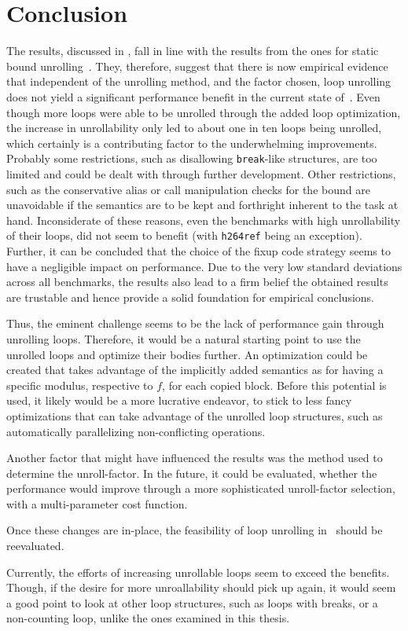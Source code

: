 \chapter{Conclusion}\label{sec:conclusion}

The results, discussed in , fall in line with the results from the ones for static bound unrolling~\cite{aebi18bachelorarbeit}.
They, therefore, suggest that there is now empirical evidence that independent of the unrolling method, and the factor chosen, loop unrolling does not yield a significant performance benefit in the current state of~\libFIRM.
Even though more loops were able to be unrolled through the added loop optimization, the increase in unrollability only led to about one in ten loops being unrolled, which certainly is a contributing factor to the underwhelming improvements.
Probably some restrictions, such as disallowing \texttt{break}-like structures, are too limited and could be dealt with through further development.
Other restrictions, such as the conservative alias or call manipulation checks for the bound are unavoidable if the semantics are to be kept and forthright inherent to the task at hand.
Inconsiderate of these reasons, even the benchmarks with high unrollability of their loops, did not seem to benefit (with \texttt{h264ref} being an exception).
Further, it can be concluded that the choice of the fixup code strategy seems to have a negligible impact on performance.
Due to the very low standard deviations across all benchmarks, the results also lead to a firm belief the obtained results are trustable and hence provide a solid foundation for empirical conclusions.

Thus, the eminent challenge seems to be the lack of performance gain through unrolling loops.
Therefore, it would be a natural starting point to use the unrolled loops and optimize their bodies further.
An optimization could be created that takes advantage of the implicitly added semantics as for having a specific modulus, respective to $f$, for each copied block.
Before this potential is used, it likely would be a more lucrative endeavor, to stick to less fancy optimizations that can take advantage of the unrolled loop structures, such as automatically parallelizing non-conflicting operations.

Another factor that might have influenced the results was the method used to determine the unroll-factor.
In the future, it could be evaluated, whether the performance would improve through a more sophisticated unroll-factor selection, with a multi-parameter cost function.

Once these changes are in-place, the feasibility of loop unrolling in~\libFIRM{} should be reevaluated.

Currently, the efforts of increasing unrollable loops seem to exceed the benefits.
Though, if the desire for more unroallability should pick up again, it would seem a good point to look at other loop structures, such as loops with breaks, or a non-counting loop, unlike the ones examined in this thesis.
